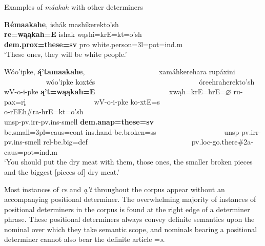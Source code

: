 \begin{exe}
    \item\label{PluralPositionalDeterminers} Examples of \textit{máakah} with other determiners

    \begin{xlist}
        \item\label{PluralPositionalDeterminersA} \glll \textbf{Rémaakahe}, ishák mashíkerekto'sh\\
        \textbf{re=wąąkah=E} ishak wąshi=krE=kt=o'sh\\
        \textbf{dem.prox=\textnormal{\bfseries these}=sv} pro \textnormal{white.person}=3l=pot=ind.m\\
        \glt `These ones, they will be white people.' \citep[13]{hollow1973a}

        \item\label{PluralPositionalDeterminersB} \glll Wóo'ipke, \textbf{ą́'tamaakahe}, ~ ~ ~ ~ ~ ~ ~ ~ ~ ~ ~ ~ xamáhkerehara rupáxini ~ ~ ~ ~ ~ ~ ~ ~ ~ ~ ~ wóo'ipke koxtés ~ ~ ~ ~ ~ ~ ~ ~ ~ ~ ~ ~ ~ ~ ~ ~ ~ óreehraherekto'sh\\
        wV-o-i-pke \textbf{ą't=wąąkah=E} ~ ~ ~ ~ ~ ~ ~ ~ ~ ~ ~ ~ xwąh=krE=hrE=$\varnothing$ ru-pax=rį ~ ~ ~ ~ ~ ~ ~ ~ ~ ~ ~ wV-o-i-pke ko-xtE=s ~ ~ ~ ~ ~ ~ ~ ~ ~ ~ ~ ~ ~ ~ ~ ~ ~ o-rEEh\#ra-hrE=kt=o'sh\\
        unsp-pv.irr-pv.ins-\textnormal{smell} \textbf{dem.anap=\textnormal{\bfseries these}=sv} ~ ~ ~ ~ ~ ~ ~ ~ ~ ~ ~ ~ \textnormal{be.small}=3pl=caus=cont ins.hand-\textnormal{be.broken}=ss ~ ~ ~ ~ ~ ~ ~ ~ ~ ~ ~ unsp-pv.irr-pv.ins-\textnormal{smell} rel-\textnormal{be.big}=def ~ ~ ~ ~ ~ ~ ~ ~ ~ ~ ~ ~ ~ ~ ~ ~ ~ pv.loc-\textnormal{go.there}\#2a-caus=pot=ind.m\\
        \glt `You should put the dry meat with them, those ones, the smaller broken pieces and the biggest [pieces of] dry meat.' \citep[223]{hollow1973b}
    \end{xlist}
\end{exe}

Most instances of \textit{re} and \textit{ą't} throughout the corpus appear without an accompanying positional determiner. The overwhelming majority of instances of positional determiners in the corpus is found at the right edge of a determiner phrase. These positional determiners always convey definite semantics upon the nominal over which they take semantic scope, and nominals bearing a positional determiner cannot also bear the definite article =\textit{s}.

